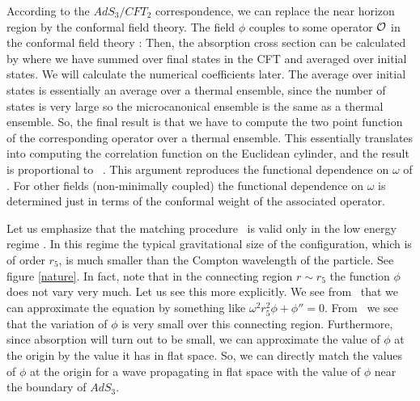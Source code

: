 According to the $AdS_3/CFT_2$ correspondence, we can replace the 
near horizon region by the conformal field theory. The field $\phi$
couples to some operator ${\cal O}$ in the conformal field 
theory \cite{Maldacena:1997ih} :
Then, the absorption cross section can be calculated by 
where we have summed over final states in the CFT and averaged over
initial states. We will calculate the numerical coefficients later. 
The average over initial states is essentially 
an average over a thermal 
ensemble, since the number of states is very large so the
microcanonical ensemble is the same as a thermal ensemble. 
So, the final result is that we have to compute the two point function
of the corresponding operator over a thermal ensemble. 
This  essentially translates into computing the correlation function
on the Euclidean cylinder, and the result is 
proportional to \absor\ \cite{Das:1996wn,Das:1996jy,Maldacena:1997ih}.
This argument reproduces the functional dependence on $\omega$ of 
\absor . For other fields (non-minimally coupled) the 
functional dependence on $\omega$ is determined just 
in terms of the conformal weight of the associated operator. 



Let us emphasize that the matching procedure  \MatchSolnAgain\
is valid only in the low energy regime \lowener .
 In this regime the
typical gravitational size of the configuration, which is of order
$r_5$, is much smaller than the Compton wavelength of the particle. See
figure \ref{nature}. 
In fact, note that in the connecting region 
 $r \sim r_5 $
the 
function $\phi$ does not vary very much.
Let us see this more explicitly. We see from \RadialLaplace\
that we can approximate the equation by something like
$ \omega^2 r_5^2 \phi + \phi'' =0$. From \lowener\ we see that
the variation of 
$\phi$ is very small over this connecting region. 
Furthermore, since absorption will turn out to be small,
we can approximate the value of $\phi $ at the origin by the 
value it has in flat space.
So, we can directly match the values of $\phi$ at the origin 
for a wave propagating in flat space with 
the value of $\phi$ near the boundary of $AdS_3$. 
 
